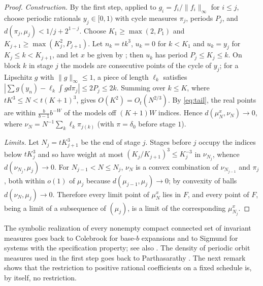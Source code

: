 \documentclass[11pt]{article}
\begin{document}
\begin{proof}
\emph{Construction.} By the first step, applied to $g_i=f_i/\|f_i\|_\infty$ for $i\le j$, choose
periodic rationals $y_j\in[0,1)$ with cycle measures $\pi_j$, periods $P_j$, and
$d(\pi_j,\mu_j)<1/j+2^{1-j}$. Choose $K_1\ge\max(2,P_1)$ and $K_{j+1}\ge\max(K_j^2,P_{j+1})$. Let
$n_k=tk^3$, $u_k=0$ for $k<K_1$ and $u_k=y_j$ for $K_j\le k<K_{j+1}$, and let $x$ be given by
; then $u_k$ has period $P_j\le K_j\le k$. On block $k$ in stage $j$ the models are
consecutive points of the cycle of $y_j$; for a Lipschitz $g$ with $\|g\|_\infty\le1$, a piece of length
$\ell_k$ satisfies $|\sum g(y_n)-\ell_k\int gd\pi_j|\le2P_j\le2k$. Summing over $k\le K$, where
$tK^3\le N<t(K+1)^3$, gives $O(K^2)=O_t(N^{2/3})$. By
\eqref{eq:tail}, the real points are within $\frac b{b-1}b^{-W}$ of the models off $(K+1)W$ indices.
Hence $d(\mu_N^x,\nu_N)\to0$, where $\nu_N=N^{-1}\sum_k\ell_k\pi_{j(k)}$ (with $\pi=\delta_0$ before
stage $1$).

\emph{Limits.} Let $N_j=tK_{j+1}^3$ be the end of stage $j$. Stages before $j$ occupy the indices
below $tK_j^3$ and so have weight at most $(K_j/K_{j+1})^3\le K_j^{-3}$ in $\nu_{N_j}$, whence
$d(\nu_{N_j},\mu_j)\to0$. For $N_{j-1}<N\le N_j$,
$\nu_N$ is a convex combination of $\nu_{N_{j-1}}$ and $\pi_j$, both within $o(1)$ of $\mu_j$ because
$d(\mu_{j-1},\mu_j)\to0$; by convexity of balls $d(\nu_N,\mu_j)\to0$. Therefore every limit point of
$\mu_N^x$ lies in $F$, and every point of $F$, being a limit of a subsequence of $(\mu_j)$, is a limit
of the corresponding $\mu_{N_j}^x$.
\end{proof}

The symbolic realization of every nonempty compact connected set of invariant measures goes back to
Colebrook \cite{Colebrook} for base-$b$ expansions and to Sigmund \cite[Theorem~4]{Sigmund74} for systems
with the specification property; see also \cite{DGS}. The density of periodic orbit measures used in
the first step goes back to Parthasarathy \cite{Parthasarathy61}. The next remark shows that the
restriction to positive rational coefficients on a fixed schedule is, by itself, no restriction.
\end{document}

